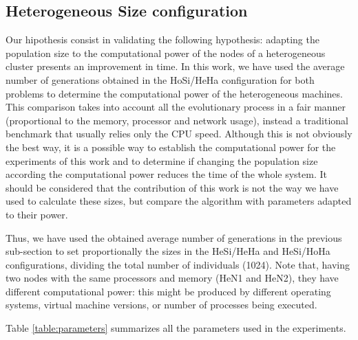 \documentclass[final,1p,times]{elsarticle}
\begin{document}
\subsection{Heterogeneous Size configuration}

Our hipothesis consist in validating the following hypothesis: adapting the population size to the computational power of the nodes of a heterogeneous cluster presents an improvement in time. In this work, we have used the average number of generations obtained in the HoSi/HeHa configuration for both problems to determine the computational power of the heterogeneous machines. This comparison takes into account all the evolutionary process in a fair manner (proportional to the memory, processor and network usage), instead a traditional benchmark that usually relies only the CPU speed. Although this is not obviously the best way, it is a possible way to establish the computational power for the experiments of this work and to determine if changing the population size according the computational power reduces the time of the whole system. It should be considered that the contribution of this work is not the way we have used to calculate these sizes, but compare the algorithm with parameters adapted to their power.

Thus, we have used the obtained average number of generations in the previous sub-section to set proportionally the sizes in the HeSi/HeHa and HeSi/HoHa configurations, dividing the total number of individuals (1024). Note that, having two nodes with the same processors and memory (HeN1 and HeN2), they have different computational power: this might be produced by different operating systems, virtual machine versions, or number of processes being executed.

Table \ref{table:parameters} summarizes all the parameters used in the experiments.
\end{document}

